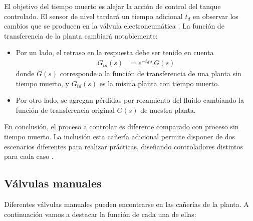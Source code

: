 El objetivo del tiempo muerto es alejar la acción de control del tanque
controlado.
El sensor de nivel tardará un tiempo adicional $t_d$ en observar los cambios
que se producen en la válvula electroneumática \cite{bib:ApuntesPuglesiTema2}.
La función de transferencia de la planta cambiará notablemente:
\begin{itemize}
 \item Por un lado, el retraso en la respuesta debe ser tenido en cuenta
 \begin{align}
  G_{td}(s) &= e^{-t_d\,s}\,G(s)
 \end{align}
 donde $G(s)$ corresponde a la función de transferencia de una planta sin
 tiempo muerto, y $G_{td}(s)$ es la misma planta con tiempo muerto.
  \item Por otro lado, se agregan pérdidas por rozamiento del
  fluido cambiando la función de transferencia original $G(s)$ de nuestra
  planta.
\end{itemize}
En conclusión, el proceso a controlar es diferente comparado con proceso sin
tiempo muerto.
La inclusión esta cañería adicional permite disponer de dos escenarios
diferentes para realizar prácticas, diseñando controladores distintos para
cada caso \cite{bib:ApuntesPuglesiTema2}.

\subsection{Válvulas manuales}

Diferentes válvulas manuales pueden encontrarse en las cañerías de la planta.
A continuación vamos a destacar la función de cada una de ellas:

